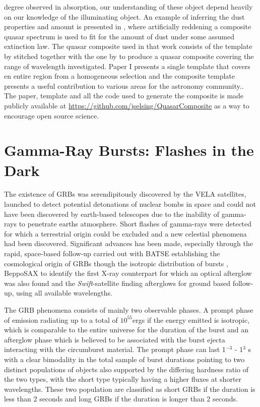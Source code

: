 degree observed in
absorption, our understanding of these object depend heavily
on our knowledge of
the illuminating object. An example of inferring the dust
properties and amount
is presented in \citet{Krogager2015}, where artificially
reddening a composite quasar
spectrum is used to fit for the amount of dust
under some assumed extinction
law. The quasar composite used in that work
consists of the template by
\citet{Vandenberk2001} stitched together with the
one by \citet{Glikman2006} to
produce a quasar composite covering the range of
wavelength investigated. Paper
I presents a single template that covers en
entire region from a homogeneous
selection and the composite template presents a
useful contribution to various areas for the astronomy community.. The paper,
template and all the code used to generate the composite is made publicly
available at \url{https://github.com/jselsing/QuasarComposite} as a way to
encourage open source science.



\section{Gamma-Ray Bursts: Flashes in the Dark}
\label{sec:intro:grb}

The existence of GRBs was serendipitously discovered by the VELA satellites,
launched to detect potential detonations of nuclear bombs in space and
could not
have been discovered by earth-based telescopes due to the inability of
gamma-rays to penetrate earths atmosphere. Short flashes of gamma-rays were
detected for which a terrestrial origin could be excluded and a new celestial
phenomena had been discovered. 
Significant advances has been made, especially
through the rapid, space-based
follow-up carried out with BATSE
\citep{Harmon2004} establishing the
cosmological origin of GRBs though the
isotropic distribution of bursts
\citep{Meegan1992},  BeppoSAX
\citep{Boella1997} 
to identify the first X-ray counterpart \citep{Costa1997}
for which an optical
afterglow was also found and the \textit{Swift}-satellite
\citep{Gehrels2004} finding afterglows for ground based follow-up, using all
available wavelengths. 

The GRB phenomena consists of mainly two observable phases. A prompt phase of
emission radiating up to a total of $10^{55} $ergs if the energy emitted
is
isotropic, which is comparable to the entire universe \citep{Kumar2014} for
the
duration of the burst and an afterglow phase which is believed to be
associated
with the burst ejecta interacting with the circumburst material. The
prompt
phase can last 1$^{-3}$ - 1$^3$ s with a clear bimodality in the total
sample of
burst durations pointing to two distinct populations of objects also
supported
by the differing hardness ratio of the two types, with the short type
typically
having a higher fluxes at shorter wavelengths. These two population
are
classified as short GRBs if the duration is less than 2 seconds and long
GRBs if
the duration is longer than 2 seconds. 

